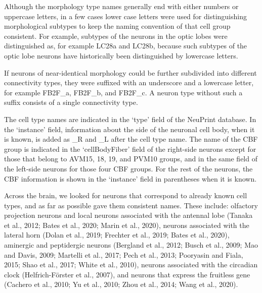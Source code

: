 \documentclass{article}
\begin{document}
Although the morphology type names generally end with either numbers or uppercase letters, in a few cases lower case letters were used for distinguishing morphological subtypes to keep the naming convention of that cell group consistent. For example, subtypes of the neurons in the optic lobes were distinguished as, for example LC28a and LC28b, because such subtypes of the optic lobe neurons have historically been distinguished by lowercase letters.

If neurons of near-identical morphology could be further subdivided into different connectivity types, they were suffixed with an underscore and a lowercase letter, for example FB2F\_a, FB2F\_b, and FB2F\_c. A neuron type without such a suffix consists of a single connectivity type.

The cell type names are indicated in the ‘type’ field of the NeuPrint database. In the ‘instance’ field, information about the side of the neuronal cell body, when it is known, is added as \_R and \_L after the cell type name. The name of the CBF group is indicated in the ‘cellBodyFiber’ field of the right-side neurons except for those that belong to AVM15, 18, 19, and PVM10 groups, and in the same field of the left-side neurons for those four CBF groups. For the rest of the neurons, the CBF information is shown in the ‘instance’ field in parentheses when it is known.

Across the brain, we looked for neurons that correspond to already known cell types, and as far as possible gave them consistent names. These include: olfactory projection neurons and local neurons associated with the antennal lobe (Tanaka et al., 2012; Bates et al., 2020; Marin et al., 2020), neurons associated with the lateral horn (Dolan et al., 2019; Frechter et al., 2019; Bates et al., 2020), aminergic and peptidergic neurons (Bergland et al., 2012; Busch et al., 2009; Mao and Davis, 2009; Martelli et al., 2017; Pech et al., 2013; Pooryasin and Fiala, 2015; Shao et al., 2017; White et al., 2010), neurons associated with the circadian clock (Helfrich-Förster et al., 2007), and neurons that express the fruitless gene (Cachero et al., 2010; Yu et al., 2010; Zhou et al., 2014; Wang et al., 2020).
\end{document}

